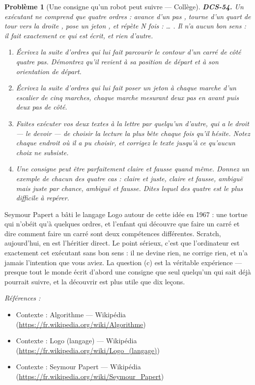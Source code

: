 \documentclass[11pt]{article}
\newtheorem{problem}{Problème}
\newenvironment{refs}{\par\small\noindent\emph{Références :}\begin{itemize}\setlength\itemsep{0pt}}{\end{itemize}\normalsize}
\begin{document}
\begin{problem}[{Une consigne qu'un robot peut suivre --- Collège}]
\textbf{DCS-54.} Un exécutant ne comprend que quatre ordres : \og{} avance d'un pas \fg{},
\og{} tourne d'un quart de tour vers la droite \fg{}, \og{} pose un jeton \fg{}, et \og{} répète N fois : \dots{} \fg{}.
Il n'a aucun bon sens : il fait exactement ce qui est écrit, et rien d'autre.
\begin{enumerate}
\item[(a)] Écrivez la suite d'ordres qui lui fait parcourir le contour d'un carré de côté quatre
pas. Démontrez qu'il revient à sa position de départ \textit{et} à son orientation de
départ.
\item[(b)] Écrivez la suite d'ordres qui lui fait poser un jeton à chaque marche d'un escalier de
cinq marches, chaque marche mesurant deux pas en avant puis deux pas de côté.
\item[(c)] Faites exécuter vos deux textes à la lettre par quelqu'un d'autre, qui a le droit --- le
devoir --- de choisir la lecture la plus bête chaque fois qu'il hésite. Notez chaque endroit
où il a pu choisir, et corrigez le texte jusqu'à ce qu'aucun choix ne subsiste.
\item[(d)] Une consigne peut être parfaitement claire et fausse quand même. Donnez un exemple de
chacun des quatre cas : claire et juste, claire et fausse, ambiguë mais juste par chance,
ambiguë et fausse. Dites lequel des quatre est le plus difficile à repérer.
\end{enumerate}

\end{problem}

\noindent Seymour Papert a bâti le langage Logo autour de cette idée en 1967 : une
tortue qui n'obéit qu'à quelques ordres, et l'enfant qui découvre que \og{} faire un carré \fg{} et
\og{} dire comment faire un carré \fg{} sont deux compétences différentes. Scratch, aujourd'hui, en
est l'héritier direct. Le point sérieux, c'est que l'ordinateur est exactement cet exécutant
sans bon sens : il ne devine rien, ne corrige rien, et n'a jamais l'intention que vous aviez.
La question (c) est la véritable expérience --- presque tout le monde écrit d'abord une
consigne que seul quelqu'un qui sait déjà pourrait suivre, et la découvrir est plus utile
que dix leçons.

\begin{refs}
\item Contexte : Algorithme --- Wikipédia (\url{https://fr.wikipedia.org/wiki/Algorithme})
\item Contexte : Logo (langage) --- Wikipédia (\url{https://fr.wikipedia.org/wiki/Logo_(langage)})
\item Contexte : Seymour Papert --- Wikipédia (\url{https://fr.wikipedia.org/wiki/Seymour_Papert})
\end{refs}
\end{document}
